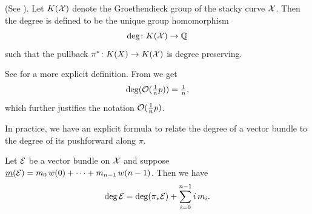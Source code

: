 \documentclass{article}
\begin{document}
\begin{defi}(See \cite[Definition 1.2.9]{Taams}).
Let $K(\mathcal{X})$ denote the Groethendieck group of the stacky curve $\mathcal{X}$. Then the degree is defined to be the unique group homomorphism
\begin{equation}
\deg\colon K(\mathcal{X}) \to \mathbb{Q}
\end{equation}
such that the pullback $\pi^*\colon K(X) \to K(\mathcal{X})$ is degree preserving.
\end{defi}
See \cite[\S 1.2]{Taams} for a more explicit definition. From  we get
\begin{equation}
\deg(\mathcal{O}(\tfrac{1}{n}p)) = \tfrac{1}{n},
\end{equation}
which further justifies the notation $\mathcal{O}(\tfrac{1}{n}p)$.

In practice, we have an explicit formula to relate the degree of a vector bundle to the degree of its pushforward along $\pi$.
\begin{prop}\cite[Theorem 1.2.30]{Taams} \label{formula degree-multiplicities}
Let $\mathcal{E}$ be a vector bundle on $\mathcal{X}$ and suppose $\underline{m}(\mathcal{E}) = m_0 \, w(0) + \dots + m_{n-1} \, w(n-1)$. Then we have
\begin{equation}
\deg \mathcal{E} = \deg(\pi_* \mathcal{E}) + \sum_{i=0}^{n-1} i \,  m_i .
\end{equation}
\end{prop}



\end{document}
